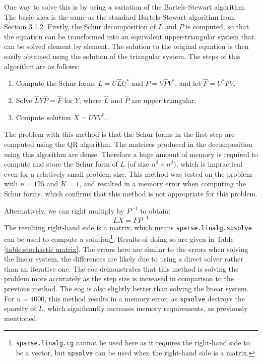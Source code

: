 \documentclass[11pt]{article}
\numberwithin{equation}{section}
\begin{document}
One way to solve this is by using a variation of the Bartels-Stewart algorithm. The basic idea is the same as the standard Bartels-Stewart algorithm from Section 3.1.2. Firstly, the Schur decomposition of $L$ and $P$ is computed, so that the equation can be transformed into an equivalent upper-triangular system that can be solved element by element. The solution to the original equation is then easily obtained using the solution of the triangular system. The steps of this algorithm are as follows:
\begin{enumerate}
\item Compute the Schur forms $L = U \hat{L} U^*$ and $P = V \hat{P} V^*$, and let $\hat{F} = U^* F V$.
\item Solve $\hat{L} Y \hat{P} = \hat{F}$ for $Y$, where $\hat{L}$ and $\hat{P}$ are upper triangular.
\item Compute solution $X = UYV^*$.
\end{enumerate}
The problem with this method is that the Schur forms in the first step are computed using the QR algorithm. The matrices produced in the decomposition using this algorithm are dense. Therefore a huge amount of memory is required to compute and store the Schur form of $L$ (of size $n^2 \times n^2$), which is impractical even for a relatively small problem size. This method was tested on the problem with $n=125$ and $K=1$, and resulted in a memory error when computing the Schur forms, which confirms that this method is not appropriate for this problem.

Alternatively, we can right multiply by $P^{-1}$ to obtain:
\begin{equation}
LX = FP^{-1}
\end{equation}
The resulting right-hand side is a matrix, which means \texttt{sparse.linalg.spsolve} can be used to compute a solution\footnote{\texttt{sparse.linalg.cg} cannot be used here as it requires the right-hand side to be a vector, but \texttt{spsolve} can be used when the right-hand side is a matrix.}. Results of doing so are given in Table \ref{table:stochastic matrix}. The errors here are similar to the errors when solving the linear system, the differences are likely due to using a direct solver rather than an iterative one. The eoc demonstrates that this method is solving the problem more accurately as the step size is increased in comparison to the previous method. The eog is also slightly better than solving the linear system. For $n=4000$, this method results in a memory error, as \texttt{spsolve} destroys the sparsity of $L$, which significantly increases memory requirements, as previously mentioned.
\end{document}
